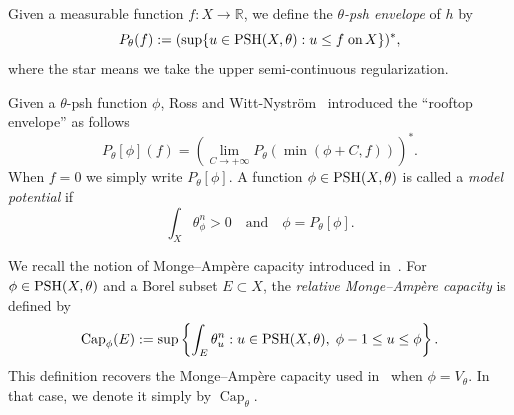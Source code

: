 \documentclass[a4paper,11pt]{amsart}
\numberwithin{equation}{section}
\newtheorem{theorem}{Theorem}[section]
\theoremstyle{definition}
\newcommand{\PSH}{{\rm PSH}}
\newcommand{\capacity}{\mathop{\mathrm{Cap}}\nolimits}
\begin{document}
\smallskip 



Given a measurable function $f:X\to\mathbb{R}$, we define the {\em $\theta$-psh envelope} of $h$ by
\begin{equation*}
P_\theta(f):=(\sup\{u\in\PSH(X,\theta): u\leq f\;\text{on}\, X \})^*,
\end{equation*} where the star means we take the upper semi-continuous regularization. %

Given a $\theta$-psh function $\phi$, 
Ross and Witt-Nystr\"om~\cite{ross2014analytic} introduced the ``rooftop envelope'' as follows
\[P_\theta[\phi](f)= \left( \lim_{C\to +\infty}P_\theta(\min(\phi+C,f))\right)^*. \]
When $f=0$ we simply write $P_\theta[\phi]$. 
A function $\phi\in\PSH(X,\theta)$ is called a {\em model potential} if $$\int_X\theta_\phi^n>0\quad\text{and}\quad\phi=P_\theta[\phi].$$

We recall the notion of Monge--Ampère capacity introduced in~\cite{di2017complex,di2015generalized}.
For $\phi \in \PSH(X,\theta)$ and a Borel subset $E \subset X$, the {\em relative Monge–Ampère capacity} is defined by
    \begin{equation*}
        \capacity_{\phi}(E):=\sup\left\{\int_E\theta_u^n: u\in\PSH(X,\theta),\;\phi-1\leq u\leq \phi \right\}.
    \end{equation*}
This definition recovers the Monge--Ampère capacity used in~\cite{boucksom2010monge} when $\phi = V_\theta$. In that case, we denote it simply by $\capacity_\theta$.
\end{document}
